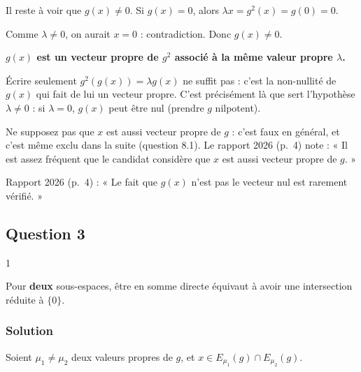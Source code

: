 \documentclass[11pt,a4paper]{article}
\begin{document}
Il reste à voir que \(g(x)\neq0\). Si \(g(x)=0\), alors \(\lambda x=g^2(x)=g(0)=0\).

Comme \(\lambda\neq0\), on aurait \(x=0\) : contradiction. Donc \(g(x)\neq0\).

\textbf{\(g(x)\) est un vecteur propre de \(g^2\) associé à la même valeur propre \(\lambda\).}

\begin{piege}

Écrire seulement \(g^2(g(x))=\lambda g(x)\) ne suffit pas : c'est la non-nullité de \(g(x)\) qui fait de lui un vecteur propre. C'est précisément là que sert l'hypothèse \(\lambda\neq0\) : si \(\lambda=0\), \(g(x)\) peut être nul (prendre \(g\) nilpotent).

\end{piege}

\begin{piege}

Ne supposez pas que \(x\) est aussi vecteur propre de \(g\) : c'est faux en général, et c'est même exclu dans la suite (question 8.1). Le rapport 2026 (p.~4) note : « Il est assez fréquent que le candidat considère que \(x\) est aussi vecteur propre de \(g\). »

\end{piege}

\begin{jury}

Rapport 2026 (p.~4) : « Le fait que \(g(x)\) n'est pas le vecteur nul est rarement vérifié. »

\end{jury}

\hypertarget{question-3}{%
\subsection{Question 3}\label{question-3}}

\begin{indication}{1}

Pour \textbf{deux} sous-espaces, être en somme directe équivaut à avoir une intersection réduite à \(\{0\}\).

\end{indication}

\hypertarget{solution-2}{%
\subsubsection{Solution}\label{solution-2}}

Soient \(\mu_1\neq\mu_2\) deux valeurs propres de \(g\), et \(x\in E_{\mu_1}(g)\cap E_{\mu_2}(g)\).
\end{document}
